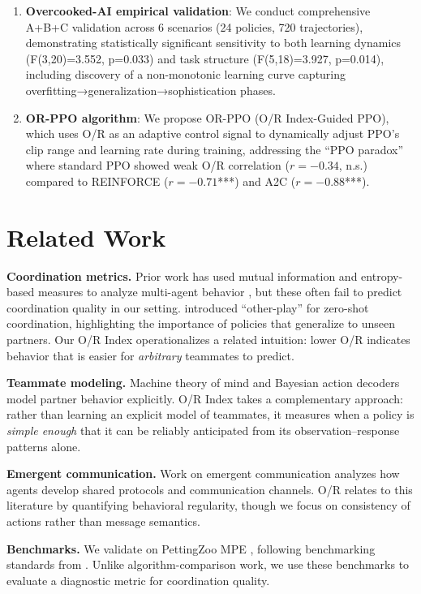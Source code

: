 \documentclass[twoside]{article}
\theoremstyle{remark}
\begin{document}
\begin{enumerate}
    \item \textbf{Overcooked-AI empirical validation}: We conduct comprehensive
    A+B+C validation across 6 scenarios (24 policies, 720 trajectories),
    demonstrating statistically significant sensitivity to both learning dynamics
    (F(3,20)=3.552, p=0.033) and task structure (F(5,18)=3.927, p=0.014),
    including discovery of a non-monotonic learning curve capturing
    overfitting→generalization→sophistication phases.
    \item \textbf{OR-PPO algorithm}: We propose OR-PPO (O/R Index-Guided PPO),
    which uses O/R as an adaptive control signal to dynamically adjust PPO's clip
    range and learning rate during training, addressing the ``PPO paradox'' where
    standard PPO showed weak O/R correlation ($r = -0.34$, n.s.) compared to
    REINFORCE ($r = -0.71$***) and A2C ($r = -0.88$***).
\end{enumerate}

\section{Related Work}

\textbf{Coordination metrics.}
Prior work has used mutual information and entropy-based measures to analyze
multi-agent behavior \citep{jaques2019social}, but these often fail to predict
coordination quality in our setting. \citet{hu2020other} introduced
``other-play'' for zero-shot coordination, highlighting the importance of
policies that generalize to unseen partners. Our O/R Index operationalizes a
related intuition: lower O/R indicates behavior that is easier for
\emph{arbitrary} teammates to predict.

\textbf{Teammate modeling.}
Machine theory of mind \citep{rabinowitz2018machine} and Bayesian action
decoders \citep{foerster2019bayesian} model partner behavior explicitly. O/R
Index takes a complementary approach: rather than learning an explicit model of
teammates, it measures when a policy is \emph{simple enough} that it can be
reliably anticipated from its observation--response patterns alone.

\textbf{Emergent communication.}
Work on emergent communication
\citep{mordatch2018emergence,eccles2019biases} analyzes how agents develop
shared protocols and communication channels. O/R relates to this literature by
quantifying behavioral regularity, though we focus on consistency of actions
rather than message semantics.

\textbf{Benchmarks.}
We validate on PettingZoo MPE \citep{terry2021pettingzoo}, following
benchmarking standards from \citet{papoudakis2021benchmarking}. Unlike
algorithm-comparison work, we use these benchmarks to evaluate a diagnostic
metric for coordination quality.
\end{document}
